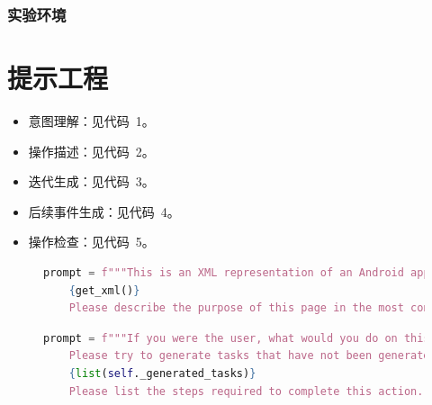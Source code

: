 \documentclass[twocolumn, 10pt]{article}
\begin{document}
\subsubsection{实验环境}




\appendix

\section{提示工程}
\label{sec:prompt}

\begin{itemize}
    \item 意图理解：见代码~1。
    \item 操作描述：见代码~2。
    \item 迭代生成：见代码~3。
    \item 后续事件生成：见代码~4。
    \item 操作检查：见代码~5。
\end{itemize}

\begin{figure}[t]
\centering
\begin{lstlisting}[language=Python,caption=意图理解]
    prompt = f"""This is an XML representation of an Android application page:
    {get_xml()}
    Please describe the purpose of this page in the most concise language possible."""
\end{lstlisting}
\label{fig:intent}
\end{figure}

\begin{figure}[t]
\centering
\begin{lstlisting}[language=python, caption=操作描述]
    prompt = f"""If you were the user, what would you do on this page? You can only describe one action. 
    Please try to generate tasks that have not been generated before. Below are the tasks that have already been generated:
    {list(self._generated_tasks)}
    Please list the steps required to complete this action. (This action will be named 'The Task')"""
\end{lstlisting}
\label{fig:action}
\end{figure}
\end{document}
